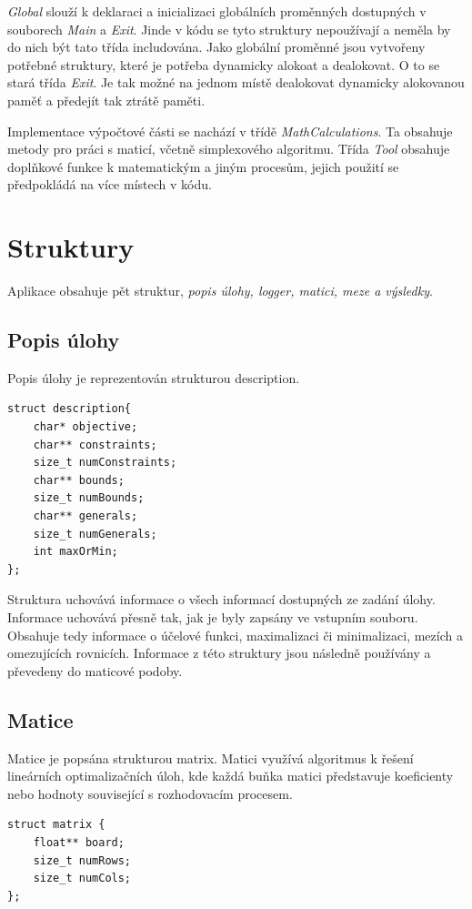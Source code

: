 \documentclass[
12pt,
a4paper,
pdftex,
czech,
titlepage
]{report}
\begin{document}
\begin{itemize}[label={}]
\textit{Global} slouží k deklaraci a inicializaci globálních proměnných dostupných v souborech \textit{Main} a \textit{Exit}. Jinde v kódu se tyto struktury nepoužívají a neměla by do nich být tato třída includována. 
Jako globální proměnné jsou vytvořeny potřebné struktury, které je potřeba dynamicky alokoat a dealokovat. O to se stará třída \textit{Exit}. Je tak možné na jednom místě dealokovat dynamicky alokovanou paměť a předejít tak ztrátě paměti.

Implementace výpočtové části se nachází v třídě \textit{MathCalculations}. Ta obsahuje metody pro práci s maticí, včetně simplexového algoritmu.
Třída \textit{Tool} obsahuje doplňkové funkce k matematickým a jiným procesům, jejich použití se předpokládá na více místech v kódu.

\section{Struktury}
Aplikace obsahuje pět struktur, \textit{popis úlohy, logger, matici, meze a výsledky}. 
\subsection{Popis úlohy}

Popis úlohy je reprezentován strukturou description.
\begin{verbatim}
struct description{
    char* objective;
    char** constraints; 
    size_t numConstraints; 
    char** bounds; 
    size_t numBounds;
    char** generals; 
    size_t numGenerals;
    int maxOrMin; 
};
\end{verbatim}

Struktura uchovává informace o všech informací dostupných ze zadání úlohy. Informace uchovává přesně tak, jak je byly zapsány ve vstupním souboru.
Obsahuje tedy informace o účelové funkci, maximalizaci či minimalizaci, mezích a omezujících rovnicích.
Informace z této struktury jsou následně používány a převedeny do maticové podoby.

\subsection{Matice}
Matice je popsána strukturou matrix. Matici využívá algoritmus k řešení lineárních optimalizačních úloh, kde každá buňka matici představuje koeficienty nebo hodnoty související s rozhodovacím procesem.

\begin{verbatim}
struct matrix {
    float** board;
    size_t numRows;
    size_t numCols;
};
\end{verbatim}


\end{itemize}
\end{document}
